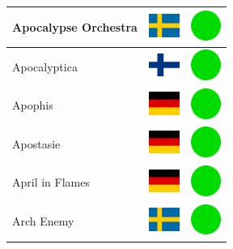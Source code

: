\documentclass[12pt, a4paper, twoside]{report}
\begin{document}
\begin{center}
\begin{longtable}{|p{5cm}|p{2cm}|p{2cm}|}
 Apocalypse Orchestra                                       & \includegraphics[width=1cm]{../img/flags/se} &   \includegraphics[width=1cm]{../likes/y} \\ \hline
 Apocalyptica                                               & \includegraphics[width=1cm]{../img/flags/fi} &   \includegraphics[width=1cm]{../likes/y} \\ \hline
 Apophis                                                    & \includegraphics[width=1cm]{../img/flags/de} &   \includegraphics[width=1cm]{../likes/y} \\ \hline
 Apostasie                                                  & \includegraphics[width=1cm]{../img/flags/de} &   \includegraphics[width=1cm]{../likes/y} \\ \hline
 April in Flames                                            & \includegraphics[width=1cm]{../img/flags/de} &   \includegraphics[width=1cm]{../likes/y} \\ \hline
 Arch Enemy                                                 & \includegraphics[width=1cm]{../img/flags/se} &   \includegraphics[width=1cm]{../likes/y} \\ \hline

\end{longtable}
\end{center}
\end{document}
